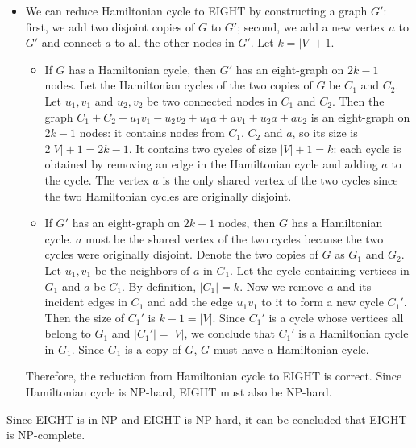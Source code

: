 \documentclass[11pt]{article}
\begin{document}
\begin{solution}
\begin{enumerate}[(a)]
\begin{itemize}
\item We can reduce Hamiltonian cycle to EIGHT by constructing a graph $G'$: first, we add two disjoint copies of $G$ to $G'$; second, we add a new vertex $a$ to $G'$ and connect $a$ to all the other nodes in $G'$. Let $k=|V|+1$.
\begin{itemize}
\item If $G$ has a Hamiltonian cycle, then $G'$ has an eight-graph on $2k-1$ nodes. Let the Hamiltonian cycles of the two copies of $G$ be $C_1$ and $C_2$. Let $u_1, v_1$ and $u_2, v_2$ be two connected nodes in $C_1$ and $C_2$. Then the graph $C_1+C_2-u_1v_1-u_2v_2+u_1a+av_1+u_2a+av_2$ is an eight-graph on $2k-1$ nodes: it contains nodes from $C_1$, $C_2$ and $a$, so its size is $2|V|+1=2k-1$. It contains two cycles of size $|V|+1=k$: each cycle is obtained by removing an edge in the Hamiltonian cycle and adding $a$ to the cycle. The vertex $a$ is the only shared vertex of the two cycles since the two Hamiltonian cycles are originally disjoint.
\item If $G'$ has an eight-graph on $2k-1$ nodes, then $G$ has a Hamiltonian cycle. $a$ must be the shared vertex of the two cycles because the two cycles were originally disjoint. Denote the two copies of $G$ as $G_1$ and $G_2$. Let $u_1, v_1$ be the neighbors of $a$ in $G_1$. Let the cycle containing vertices in $G_1$ and $a$ be $C_1$. By definition, $|C_1|=k$. Now we remove $a$ and its incident edges in $C_1$ and add the edge $u_1v_1$ to it to form a new cycle $C_1'$. Then the size of $C_1'$ is $k-1=|V|$. Since $C_1'$ is a cycle whose vertices all belong to $G_1$ and $|C_1'|=|V|$, we conclude that $C_1'$ is a Hamiltonian cycle in $G_1$. Since $G_1$ is a copy of $G$, $G$ must have a Hamiltonian cycle.
\end{itemize}
Therefore, the reduction from Hamiltonian cycle to EIGHT is correct. Since Hamiltonian cycle is NP-hard, EIGHT must also be NP-hard.
\end{itemize}
Since EIGHT is in NP and EIGHT is NP-hard, it can be concluded that EIGHT is NP-complete.
\end{enumerate}
\end{solution}
\end{document}
